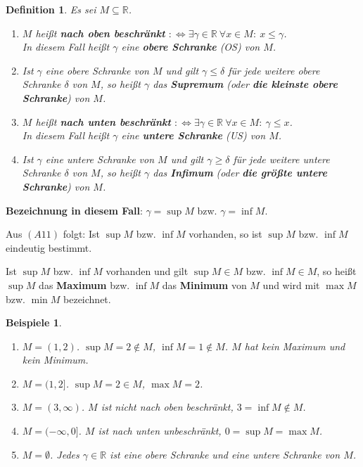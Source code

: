 \documentclass[12pt]{extreport} %
\newcommand{\R}{\mathbb{R}}
\theoremstyle{named}
\theoremstyle{itshape}
\newtheorem*{definition}{Definition}
\theoremstyle{normal}
\newtheorem*{beispiele}{Beispiele}
\begin{document}
   
\begin{definition}
	Es sei $M \subseteq \R$. 
	\begin{enumerate}
		\item $M$ hei{\ss}t \textbf{nach oben beschränkt} $:\iff \exists \gamma \in \R ~ \forall x \in M: \: x \leq \gamma$. \\
			In diesem Fall hei{\ss}t $\gamma$ eine \textbf{obere Schranke} (OS) von $M$.
		\item Ist $\gamma$ eine obere Schranke von $M$ und gilt $\gamma \leq \delta$ für jede weitere obere Schranke $\delta$ von $M$, so hei{\ss}t $\gamma$ das 
		      \textbf{Supremum} (oder \textbf{die kleinste obere Schranke}) von $M$.
		\item $M$ hei{\ss}t \textbf{nach unten beschränkt} $:\iff \exists \gamma \in \R ~ \forall x \in M: \: \gamma \leq x$.\\
			In diesem Fall hei{\ss}t $\gamma$ eine \textbf{untere Schranke} (US) von $M$.
		\item Ist $\gamma$ eine untere Schranke von $M$ und gilt $\gamma \geq \delta$ für jede weitere untere Schranke $\delta$ von $M$, so hei{\ss}t $\gamma$ das 
		      \textbf{Infimum} (oder \textbf{die grö{\ss}te untere Schranke}) von $M$.
	\end{enumerate}
\end{definition}

\textbf{Bezeichnung in diesem Fall}: $\gamma = \sup M$ bzw. $\gamma = \inf M$.

Aus $(A11)$ folgt: Ist $\sup M$ bzw. $\inf M$ vorhanden, so ist $\sup M$ bzw. $\inf M$ eindeutig bestimmt.

Ist $\sup M$ bzw. $\inf M$ vorhanden und gilt $\sup M \in M$ bzw. $\inf M \in M$, so hei{\ss}t $\sup M$ das \textbf{Maximum} bzw. $\inf M$ das \textbf{Minimum} von $M$ 
und wird mit $\max M$ bzw. $\min M$ bezeichnet.


\begin{beispiele} ~\
	\begin{enumerate}
		\item $M = (1, 2)$. $\sup M = 2 \notin M$, $\inf M = 1 \notin M$. $M$ hat kein Maximum und kein Minimum.
		\item $M = (1, 2]$. $\sup M = 2 \in M$, $\max M = 2$.
		\item $M = (3, \infty)$. $M$ ist nicht nach oben beschränkt, $3 = \inf M \notin M$.
		\item $M = (-\infty, 0]$. $M$ ist nach unten unbeschränkt, $0 = \sup M = \max M$.
		\item $M= \emptyset$. Jedes $\gamma \in \R$ ist eine obere Schranke und eine untere Schranke von $M$.
	\end{enumerate}
\end{beispiele}
\end{document}

